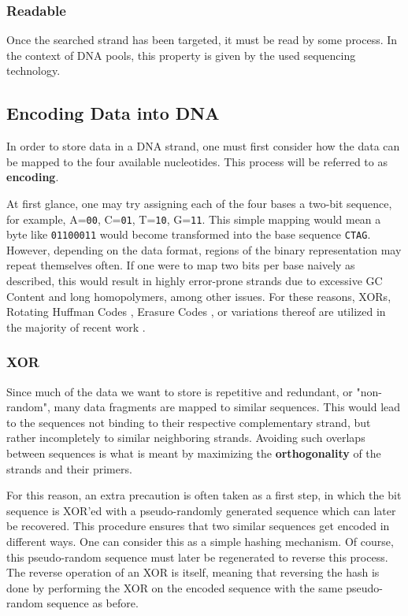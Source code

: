 \documentclass[a4paper,conference]{IEEEtran}
\begin{document}
\subsubsection{Readable}
Once the searched strand has been targeted, it must be read by some process. In the context of DNA pools, this property is given by the used sequencing technology.

\subsection{Encoding Data into DNA}
In order to store data in a DNA strand, one must first consider how the data can be mapped to the four available nucleotides. This process will be referred to as \textbf{encoding}.

At first glance, one may try assigning each of the four bases a two-bit sequence, for example, A=\texttt{00}, C=\texttt{01}, T=\texttt{10}, G=\texttt{11}. This simple mapping would mean a byte like \texttt{01100011} would become transformed into the base sequence \texttt{CTAG}. However, depending on the data format, regions of the binary representation may repeat themselves often. If one were to map two bits per base naively as described, this would result in highly error-prone strands due to excessive GC Content and long homopolymers, among other issues. For these reasons, XORs, Rotating Huffman Codes \cite{mackay_information_2003}, Erasure Codes \cite{reed_polynomial_1960}, or variations thereof are utilized in the majority of recent work \cite{goldman_towards_2013,bornholt_dna-based_2016,organick_random_2018,yazdi_rewritable_2015,lin_dynamic_2020,tomek_driving_2019}.

\subsubsection{XOR}
Since much of the data we want to store is repetitive and redundant, or "non-random", many data fragments are mapped to similar sequences. This would lead to the sequences not binding to their respective complementary strand, but rather incompletely to similar neighboring strands. Avoiding such overlaps between sequences is what is meant by maximizing the \textbf{orthogonality} of the strands and their primers.

For this reason, an extra precaution is often taken as a first step, in which the bit sequence is XOR'ed with a pseudo-randomly generated sequence which can later be recovered. This procedure ensures that two similar sequences get encoded in different ways. One can consider this as a simple hashing mechanism. Of course, this pseudo-random sequence must later be regenerated to reverse this process. The reverse operation of an XOR is itself, meaning that reversing the hash is done by performing the XOR on the encoded sequence with the same pseudo-random sequence as before.
\end{document}
